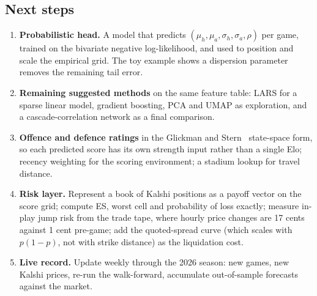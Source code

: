\documentclass[11pt]{article}
\begin{document}
\subsection{Next steps}
\begin{enumerate}[nosep]
\item \textbf{Probabilistic head.} A model that predicts $(\mu_h,\mu_a,\sigma_h,\sigma_a,\rho)$ per game, trained on the bivariate negative log-likelihood, and used to position and scale the empirical grid. The toy example shows a dispersion parameter removes the remaining tail error.
\item \textbf{Remaining suggested methods} on the same feature table: LARS for a sparse linear model, gradient boosting, PCA and UMAP as exploration, and a cascade-correlation network as a final comparison.
\item \textbf{Offence and defence ratings} in the Glickman and Stern~\cite{glickmanstern1998} state-space form, so each predicted score has its own strength input rather than a single Elo; recency weighting for the scoring environment; a stadium lookup for travel distance.
\item \textbf{Risk layer.} Represent a book of Kalshi positions as a payoff vector on the score grid; compute ES, worst cell and probability of loss exactly; measure in-play jump risk from the trade tape, where hourly price changes are 17 cents against 1 cent pre-game; add the quoted-spread curve (which scales with $p(1-p)$, not with strike distance) as the liquidation cost.
\item \textbf{Live record.} Update weekly through the 2026 season: new games, new Kalshi prices, re-run the walk-forward, accumulate out-of-sample forecasts against the market.
\end{enumerate}





\end{document}
